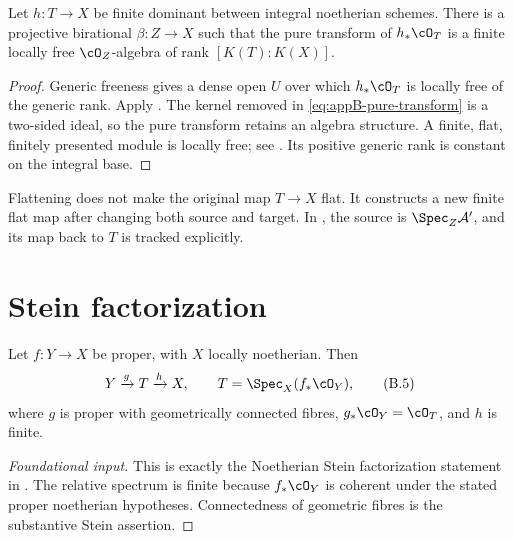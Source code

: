 \begin{corollary}\label{cor:appB-flatify-finite-algebra}
Let \(h:T\to X\) be finite dominant between integral noetherian schemes.
There is a projective birational \(\beta:Z\to X\) such that the pure
transform of \(h_*\cO_T\) is a finite locally free \(\cO_Z\)-algebra of
rank \([K(T):K(X)]\).
\end{corollary}

\begin{proof}
Generic freeness gives a dense open \(U\) over which \(h_*\cO_T\) is
locally free of the generic rank.  Apply
.  The kernel removed in
\eqref{eq:appB-pure-transform} is a two-sided ideal, so the pure transform
retains an algebra structure.  A finite, flat, finitely presented module is
locally free; see
\cite[\href{https://stacks.math.columbia.edu/tag/02K9}{Tag 02K9}]
{stacks-project}.  Its positive generic rank is constant on the integral
base.
\end{proof}

\begin{remark}[Checkpoint]
\label{rem:appB-flatification-new-source}
Flattening does not make the original map \(T\to X\) flat.  It constructs
a new finite flat map after changing both source and target.  In
, the source is
\(\Spec_Z\mathcal A'\), and its map back to \(T\) is tracked explicitly.
\end{remark}

\section{Stein factorization}
\label{sec:appB-stein}

\begin{theorem}\label{thm:appB-stein-factorization}
Let \(f:Y\to X\) be proper, with \(X\) locally noetherian.  Then
\[
 Y\xrightarrow{g}T\xrightarrow{h}X,
\qquad
 T=\Spec_X(f_*\cO_Y),
\tag{B.5}\label{eq:appB-stein}
\]
where \(g\) is proper with geometrically connected fibres,
\(g_*\cO_Y=\cO_T\), and \(h\) is finite.
\end{theorem}

\begin{proof}[Foundational input]
This is exactly the Noetherian Stein factorization statement in
\cite[\href{https://stacks.math.columbia.edu/tag/03H0}{Tag 03H0}]
{stacks-project}.  The relative spectrum is finite because
\(f_*\cO_Y\) is coherent under the stated proper noetherian hypotheses.
Connectedness of geometric fibres is the substantive Stein assertion.
\end{proof}


